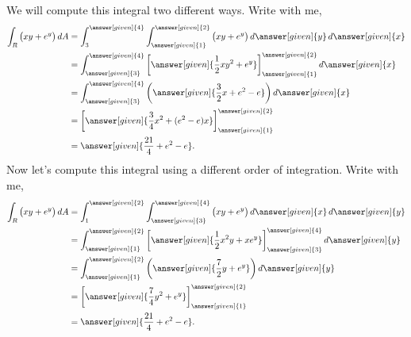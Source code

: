 \documentclass{ximera}
\begin{document}
\begin{example}
\begin{image}
  \end{image}
  \begin{explanation}
    We will compute this integral two different ways. Write with me,
    \begin{align*}
      \int_R \big(xy+e^y\big) \d A &= \int_3^{\answer[given]{4}}\int_{\answer[given]{1}}^{\answer[given]{2}}\big(xy+e^y\big) \d \answer[given]{y} \d \answer[given]{x}\\
      &= \int_{\answer[given]{3}}^{\answer[given]{4}} \eval{\answer[given]{\frac{1}{2}xy^2+e^y}}_{\answer[given]{1}}^{\answer[given]{2}} \d \answer[given]{x} \\
      &= \int_{\answer[given]{3}}^{\answer[given]{4}}\left(\answer[given]{\frac{3}{2}x + e^2-e}\right)\d \answer[given]{x} \\
      &= \eval{\answer[given]{\frac{3}{4}x^2 + (e^2-e)x}}_{\answer[given]{1}}^{\answer[given]{2}} \\
      &= \answer[given]{\frac{21}{4}+ e^2-e}.
    \end{align*}
  Now let's compute this integral using a different order of
  integration. Write with me,
  \begin{align*}
    \int_R\big(xy+e^y\big) \d A &= \int_1^{\answer[given]{2}}\int_{\answer[given]{3}}^{\answer[given]{4}}\big(xy+e^y\big)\d \answer[given]{x} \d \answer[given]{y} \\
    &= \int_{\answer[given]{1}}^{\answer[given]{2}}\eval{\answer[given]{\frac{1}{2}x^2y+xe^y}}_{\answer[given]{3}}^{\answer[given]{4}}\d \answer[given]{y}\\
    &= \int_{\answer[given]{1}}^{\answer[given]{2}}\left(\answer[given]{\frac{7}{2}y+e^y}\right)\d \answer[given]{y}\\
    &= \eval{\answer[given]{\frac{7}{4}y^2+e^y}}_{\answer[given]{1}}^{\answer[given]{2}}\\
    &=\answer[given]{\frac{21}{4}+e^2-e}.
  \end{align*}
  \end{explanation}
\end{example}
\end{document}
